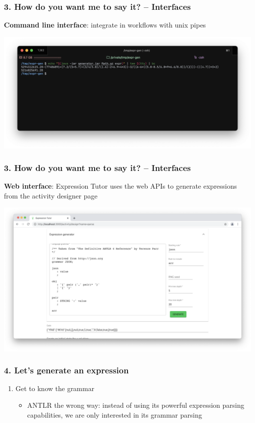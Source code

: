 \documentclass[t,aspectratio=32]{beamer}
\begin{document}
\begin{frame}
\frametitle{3. How do you want me to say it? – Interfaces}

\textbf{Command line interface}: integrate in workflows with
unix pipes

\includegraphics[width=\textwidth]{img/cli_pipes.png}
\end{frame}

\begin{frame}
\frametitle{3. How do you want me to say it? – Interfaces}

\textbf{Web interface}: Expression Tutor uses the web APIs to
generate expressions from the activity designer page

\includegraphics[width=\textwidth]{img/web_tutor_show.png}
\end{frame}


\begin{frame}
\frametitle{4. Let's generate an expression}

\begin{enumerate}
\item Get to know the grammar
    \begin{itemize}
    \item ANTLR the wrong way: instead of using its powerful expression parsing
          capabilities, we are only interested in its grammar parsing
    \end{itemize}
\end{enumerate}
\end{frame}
\end{document}
